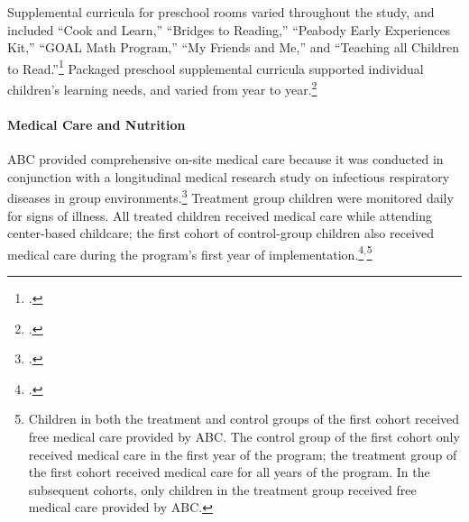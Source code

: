 \begin{appendices}
\noindent Supplemental curricula for preschool rooms varied throughout the study, and included ``Cook and Learn,'' ``Bridges to Reading,'' ``Peabody Early Experiences Kit,'' ``GOAL Math Program,'' ``My Friends and Me,'' and ``Teaching all Children to Read.''\footnote{ \citet{Greenberg_Epstein_1973_BOOKBridgestoreading,Karnes1973,Dunn_Chun_etal_1976_BOOKPeabodyearlyeducation,Davis_1977_BOOKMyfriends,Wallach_1976_Teaching-All-Children}.} Packaged preschool supplemental curricula supported individual children's learning needs, and varied from year to year.\footnote{ \citet{Ramey_McGinness_etal_1982_Abecedarianapproach,Mcginness_1981_Developing,Finkelstein_1982_Day_Care_YC,Wasik_Ramey_etal_1990_CD}.}\\

\paragraph{Medical Care and Nutrition}
ABC provided comprehensive on-site medical care because it was conducted in conjunction with a longitudinal medical research study on infectious respiratory diseases in group environments.\footnote{\citet{Henderson-et-al_1982_NEJoM}.} Treatment group children were monitored daily for signs of illness. All treated children received medical care while attending center-based childcare; the first cohort of control-group children also received medical care during the program's first year of implementation.\footnote{\citet{Ramey_Collier_etal_1976_CarolinaAbecedarianProject,Ramey_Campbell_1991_childreninpoverty,Campbell_Ramey_1994_CD}.}$^{,}$\footnote{Children in both the treatment and control groups of the first cohort received free medical care provided by ABC. The control group of the first cohort only received medical care in the first year of the program; the treatment group of the first cohort received medical care for all years of the program. In the subsequent cohorts, only children in the treatment group received free medical care provided by ABC.}\\


\end{appendices}
